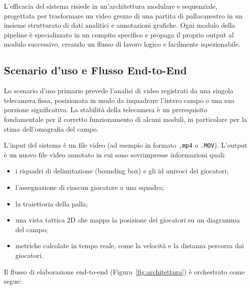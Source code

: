 \documentclass[12pt,a4paper,openright,twoside]{book}
\begin{document}
L'efficacia del sistema risiede in un'architettura modulare e 
sequenziale, progettata per trasformare un video grezzo di una 
partita di pallacanestro in un insieme strutturato di dati analitici 
e annotazioni grafiche. Ogni modulo della pipeline è specializzato in un 
compito specifico e propaga il proprio output al modulo successivo, 
creando un flusso di lavoro logico e facilmente ispezionabile.

\subsection{Scenario d'uso e Flusso End-to-End}

Lo scenario d'uso primario prevede l'analisi di video 
registrati da una singola telecamera fissa, posizionata 
in modo da inquadrare l'intero campo o una sua porzione 
significativa. La stabilità della telecamera è un prerequisito 
fondamentale per il corretto funzionamento di alcuni moduli, 
in particolare per la stima dell'omografia del campo.

L'input del sistema è un file video (ad esempio in formato 
\texttt{.mp4} o \texttt{.MOV}).
L'output è un nuovo file video annotato in cui sono sovrimpresse 
informazioni quali:
\begin{itemize}
  \item i riquadri di delimitazione (bounding box) e 
  gli \ac{id} univoci dei giocatori;
  \item l'assegnazione di ciascun giocatore a una squadra;
  \item la traiettoria della palla;
  \item una vista tattica 2D che mappa la posizione dei 
  giocatori su un diagramma del campo;
  \item metriche calcolate in tempo reale, come la velocità 
  e la distanza percorsa dai giocatori.
\end{itemize}

Il flusso di elaborazione end-to-end (Figura~\ref{fig:architettura}) 
è orchestrato come segue:
\end{document}

